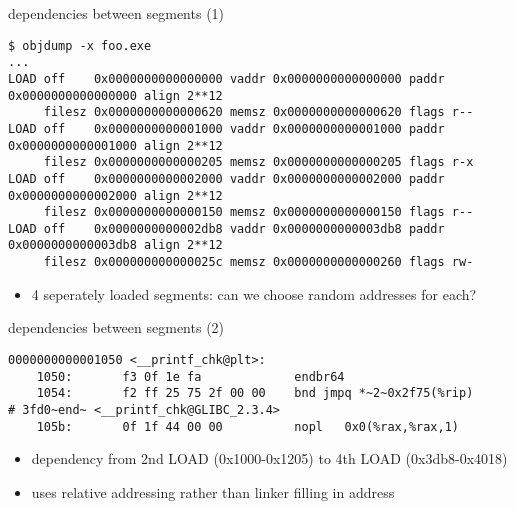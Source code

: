 
\begin{frame}[fragile,label=betweenSegments1]{dependencies between segments (1)}
\begin{lstlisting}[language={},style=smaller]
$ objdump -x foo.exe
...
LOAD off    0x0000000000000000 vaddr 0x0000000000000000 paddr 0x0000000000000000 align 2**12
     filesz 0x0000000000000620 memsz 0x0000000000000620 flags r--
LOAD off    0x0000000000001000 vaddr 0x0000000000001000 paddr 0x0000000000001000 align 2**12
     filesz 0x0000000000000205 memsz 0x0000000000000205 flags r-x
LOAD off    0x0000000000002000 vaddr 0x0000000000002000 paddr 0x0000000000002000 align 2**12
     filesz 0x0000000000000150 memsz 0x0000000000000150 flags r--
LOAD off    0x0000000000002db8 vaddr 0x0000000000003db8 paddr 0x0000000000003db8 align 2**12
     filesz 0x000000000000025c memsz 0x0000000000000260 flags rw-
\end{lstlisting}
\begin{itemize}
\item 4 seperately loaded segments: can we choose random addresses for each?
\end{itemize}
\end{frame}

\begin{frame}[fragile,label=betweenSegments2]{dependencies between segments (2)}
\begin{lstlisting}[language={},style=smaller,moredelim={**[is][\btHL<1->]{~2~}{~end~}}]
0000000000001050 <__printf_chk@plt>:
    1050:       f3 0f 1e fa             endbr64 
    1054:       f2 ff 25 75 2f 00 00    bnd jmpq *~2~0x2f75(%rip)        # 3fd0~end~ <__printf_chk@GLIBC_2.3.4>
    105b:       0f 1f 44 00 00          nopl   0x0(%rax,%rax,1)
\end{lstlisting}
\begin{itemize}
\item dependency from 2nd LOAD (0x1000-0x1205) to 4th LOAD (0x3db8-0x4018)
\item uses relative addressing rather than linker filling in address
\end{itemize}
\end{frame}


